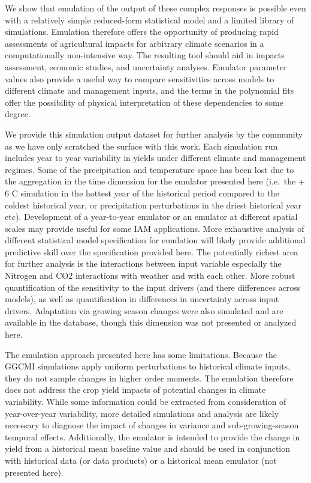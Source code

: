 \documentclass[preprint, 5p, times, twocolumn]{elsarticle}
\begin{document}
{We show that emulation of the output of these complex responses is possible even with a relatively simple reduced-form statistical model and a limited library of simulations. Emulation therefore offers the opportunity of producing rapid assessments of agricultural impacts for arbitrary climate scenarios in a computationally non-intensive way. The resulting tool should aid in impacts assessment, economic studies, and uncertainty analyses. Emulator parameter values also provide a useful way to compare sensitivities across models to different climate and management inputs, and the terms in the polynomial fits offer the possibility of physical interpretation of these dependencies to some degree.

We provide this simulation output dataset for further analysis by the community as we have only scratched the surface with this work. Each simulation run includes year to year variability in yields under different climate and management regimes. Some of the precipitation and temperature space has been lost due to the aggregation in the time dimension for the emulator presented here (i.e.\ the + 6 C simulation in the hottest year of the historical period compared to the coldest historical year, or precipitation perturbations in the driest historical year etc). Development of a year-to-year emulator or an emulator at different spatial scales may provide useful for some IAM applications. More exhaustive analysis of different statistical model specification for emulation will likely provide additional predictive skill over the specification provided here. The potentially richest area for further analysis is the interactions between input variable especially the Nitrogen and CO2 interactions with weather and with each other. More robust quantification of the sensitivity to the input drivers (and there differences across models), as well as quantification in differences in uncertainty across input drivers. Adaptation via growing season changes were also simulated and are available in the database, though this dimension was not presented or analyzed here.

The emulation approach presented here has some limitations. Because the GGCMI simulations apply uniform perturbations to historical climate inputs, they do not sample changes in higher order moments. The emulation therefore does not address the crop yield impacts of potential changes in climate variability. While some information could be extracted from consideration of year-over-year variability, more detailed simulations and analysis are likely necessary to diagnose the impact of changes in variance and sub-growing-season temporal effects. Additionally, the emulator is intended to provide the change in yield from a historical mean baseline value and should be used in conjunction with historical data (or data products) or a historical mean emulator (not presented here).

}
\end{document}

